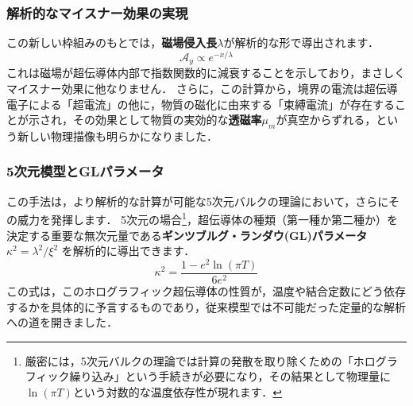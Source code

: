 \documentclass[b5paper,11pt,dvipdfmx]{jsarticle}
\numberwithin{equation}{section}
\theoremstyle{definition}
\begin{document}
\subsubsection*{解析的なマイスナー効果の実現}

この新しい枠組みのもとでは，\textbf{磁場侵入長$\lambda$}が解析的な形で導出されます．
\begin{equation}
    \mathcal{A}_{y} \propto e^{-x/\lambda}
\end{equation}
これは磁場が超伝導体内部で指数関数的に減衰することを示しており，まさしくマイスナー効果に他なりません．
さらに，この計算から，境界の電流は超伝導電子による「超電流」の他に，物質の磁化に由来する「束縛電流」が存在することが示され，その効果として物質の実効的な\textbf{透磁率$\mu_m$}が真空からずれる，という新しい物理描像も明らかになりました．

\subsubsection*{5次元模型とGLパラメータ}

この手法は，より解析的な計算が可能な5次元バルクの理論において，さらにその威力を発揮します．
5次元の場合\footnote{
厳密には，5次元バルクの理論では計算の発散を取り除くための「ホログラフィック繰り込み」という手続きが必要になり，その結果として物理量に$\ln(\pi T)$という対数的な温度依存性が現れます．
}，超伝導体の種類（第一種か第二種か）を決定する重要な無次元量である\textbf{ギンツブルグ・ランダウ(GL)パラメータ $\kappa^2 = \lambda^2 / \xi^2$} を解析的に導出できます．
\begin{equation}
     \kappa^2 = \frac{1-e^{2}\ln(\pi T)}{6e^{2}}
\end{equation}
この式は，このホログラフィック超伝導体の性質が，温度や結合定数にどう依存するかを具体的に予言するものであり，従来模型では不可能だった定量的な解析への道を開きました．




\end{document}
